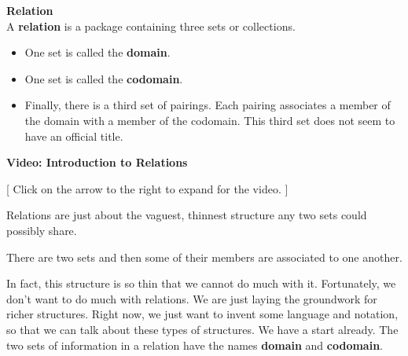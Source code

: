 \documentclass{ximera}
\begin{document}
\begin{definition} \textbf{\textcolor{green!50!black}{Relation}} \\
A \textbf{relation} is a package containing three sets or collections. 


\begin{itemize}
\item One set is called the \textbf{\textcolor{purple!85!blue}{domain}}. 
\item One set is called the \textbf{\textcolor{purple!85!blue}{codomain}}.  
\item Finally, there is a third set of pairings.  Each pairing associates a member of the domain with a member of the codomain. This third set does not seem to have an official title.
\end{itemize}

\end{definition}


\begin{explanation} \textbf{Video: Introduction to Relations}

[ Click on the arrow to the right to expand for the video. ]
\begin{expandable} 

\begin{center}
\end{center}

\end{expandable}
\end{explanation}





Relations are just about the vaguest, thinnest structure any two sets could possibly share. \\


\begin{center}
There are two sets and then some of their members are associated to one another. 
\end{center}


In fact, this structure is so thin that we cannot do much with it.  Fortunately, we don't want to do much with relations.  We are just laying the groundwork for richer structures.  Right now, we just want to invent some language and notation, so that we can talk about these types of structures. We have a start already. The two sets of information in a relation have the names \textbf{\textcolor{purple!85!blue}{domain}} and \textbf{\textcolor{purple!85!blue}{codomain}}.
\end{document}
